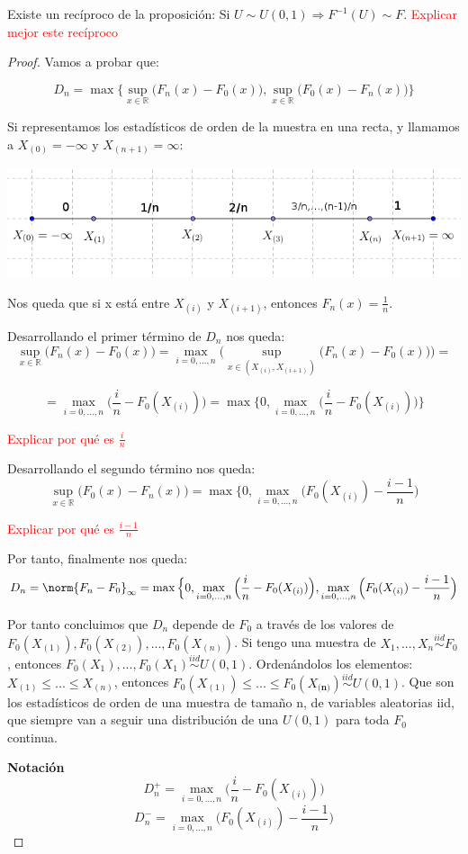 \documentclass[nochap]{apuntes}
\begin{document}
\begin{obs}
Existe un recíproco de la proposición: Si $U \sim U(0,1) \Rightarrow F^{-1}(U) \sim F$. \textcolor{red}{Explicar mejor este recíproco}
\end{obs}
\begin{proof}

Vamos a probar que:

$$ D_n = \max \Big\{ \sup_{x\in\mathbb{R}} \Big( F_n(x)-F_0(x)\Big), \sup_{x\in\mathbb{R}} \Big( F_0(x)-F_n(x)\Big) \Big\} $$

Si representamos los estadísticos de orden de la muestra en una recta, y llamamos a $X_{(0)}=-\infty$ y $X_{(n+1)}=\infty$:

\includegraphics[scale=0.5]{img/contrasteks2.png}

Nos queda que si x está entre $X_{(i)}$ y $X_{(i+1)}$, entonces $F_n(x)=\frac{1}{n}$.

Desarrollando el primer término de $D_n$ nos queda:
$$ \sup_{x\in\mathbb{R}} \Big( F_n(x)-F_0(x)\Big) = \max_{i=0,...,n} \Bigg(\sup_{x\in(X_{(i)},X_{(i+1)})} \Big( F_n(x)-F_0(x)\Big) \Bigg) = $$

$$ = \max_{i=0,...,n} \Big( \frac{i}{n} - F_0(X_{(i)}) \Big) = \max\Big\{ 0, \max_{i=0,...,n} \Big( \frac{i}{n} - F_0(X_{(i)}) \Big) \Big\}$$

\textcolor{red}{Explicar por qué es $\frac{i}{n}$}

Desarrollando el segundo término nos queda:
$$ \sup_{x\in\mathbb{R}} \Big( F_0(x)-F_n(x)\Big) = \max\Big\{ 0, \max_{i=0,...,n} \Big( F_0(X_{(i)}) - \frac{i-1}{n} \Big) $$

\textcolor{red}{Explicar por qué es $\frac{i-1}{n}$}

Por tanto, finalmente nos queda:
$$ D_n =  \norm{F_n-F_0}_{\infty} = \max\Big\{ 0, \max_{i=0,...,n} \Big( \frac{i}{n} - F_0(X_{(i)}) \Big) , \max_{i=0,...,n} \Big( F_0(X_{(i)}) - \frac{i-1}{n} \Big)$$

Por tanto concluimos que $D_n$ depende de $F_0$ a través de los valores de $F_0(X_{(1)}), F_0(X_{(2)}),...,F_0(X_{(n)})$. Si tengo una muestra de $X_1,...,X_n \stackrel{iid}{\sim}F_0$, entonces $F_0(X_1),...,F_0(X_1) \stackrel{iid}{\sim} U(0,1)$. Ordenándolos los elementos: $X_{(1)}\leq...\leq X_{(n)}$, entonces $F_0(X_{(1)})\leq...\leq F_0(X_\textbf{{(n)}}) \stackrel{iid}{\sim} U(0,1)$. Que son los estadísticos de orden de una muestra de tamaño n, de variables aleatorias iid, que siempre van a seguir una distribución de una $U(0,1)$ para toda $F_0$ continua.

\textbf{Notación}
$$D_n^+=\max_{i=0,...,n} \Big( \frac{i}{n} - F_0(X_{(i)}) \Big)$$
$$D_n^-= \max_{i=0,...,n} \Big( F_0(X_{(i)}) - \frac{i-1}{n} \Big)$$

\end{proof}
\end{document}
